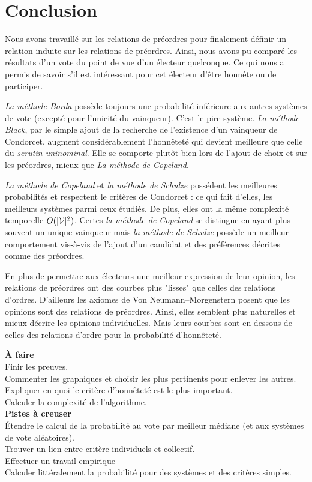 
\section{Conclusion}

Nous avons travaillé sur les relations de préordres pour finalement définir un relation induite sur les relations de préordres. Ainsi, nous avons pu comparé les résultats d'un vote du point de vue d'un électeur quelconque. Ce qui nous a permis de savoir s'il est intéressant pour cet électeur d'être honnête ou de participer.

\textit{La méthode Borda} possède toujours une probabilité inférieure aux autres systèmes de vote (excepté pour l'unicité du vainqueur). C'est le pire système.
\textit{La méthode Black}, par le simple ajout de la recherche de l'existence d'un vainqueur de Condorcet, augment considérablement l'honnêteté qui devient meilleure que celle du \textit{scrutin uninominal}. Elle se comporte plutôt bien lors de l'ajout de choix et sur les préordres, mieux que \textit{La méthode de Copeland}.

\textit{La méthode de Copeland} et \textit{la méthode de Schulze} possédent les meilleures probabilités et respectent le critères de Condorcet : ce qui fait d'elles, les meilleurs systèmes parmi ceux étudiés. De plus, elles ont la même complexité temporelle $O(|\mathcal{V}|^2)$. Certes \textit{la méthode de Copeland} se distingue en ayant plus souvent un unique vainqueur mais \textit{la méthode de Schulze} possède un meilleur comportement vis-à-vis de l'ajout d'un candidat et des préférences décrites comme des préordres.

En plus de permettre aux électeurs une meilleur expression de leur opinion, les relations de préordres ont des courbes plus "lisses" que celles des relations d'ordres. D'ailleurs les axiomes de Von Neumann–Morgenstern posent que les opinions sont des relations de préordres. Ainsi, elles semblent plus naturelles et mieux décrire les opinions individuelles. Mais leurs courbes sont en-dessous de celles des relations d'ordre pour la probabilité d'honnêteté.

\bigbreak\bigbreak

\textbf{À faire} \\
Finir les preuves. \\
Commenter les graphiques et choisir les plus pertinents pour enlever les autres. \\
Expliquer en quoi le critère d'honnêteté est le plus important. \\
Calculer la complexité de l'algorithme. \\

\textbf{Pistes à creuser} \\
Étendre le calcul de la probabilité au vote par meilleur médiane (et aux systèmes de vote aléatoires). \\
Trouver un lien entre critère individuels et collectif. \\
Effectuer un travail empirique \\
Calculer littéralement la probabilité pour des systèmes et des critères simples.
